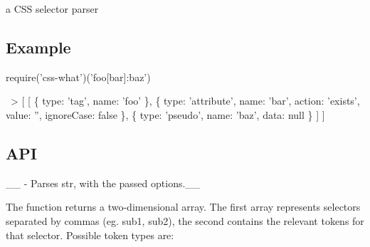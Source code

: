 a C\+SS selector parser

\subsection*{Example}


\begin{DoxyCode}
require('css-what')('foo[bar]:baz')

~> [ [ \{ type: 'tag', name: 'foo' \},
    \{ type: 'attribute',
      name: 'bar',
      action: 'exists',
      value: '',
      ignoreCase: false \},
    \{ type: 'pseudo',
      name: 'baz',
      data: null \} ] ]
\end{DoxyCode}


\subsection*{A\+PI}

\+\_\+\+\_ -\/ Parses {\ttfamily str}, with the passed {\ttfamily options}.\+\_\+\+\_\+

The function returns a two-\/dimensional array. The first array represents selectors separated by commas (eg. {\ttfamily sub1, sub2}), the second contains the relevant tokens for that selector. Possible token types are\+:

